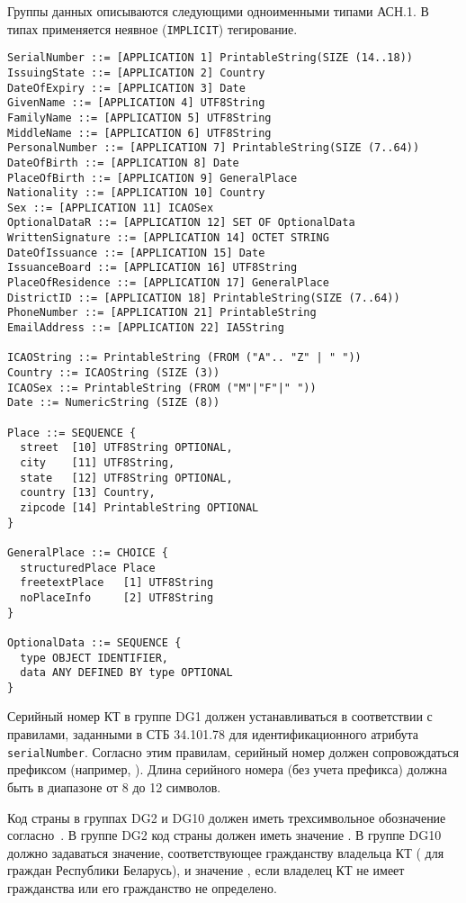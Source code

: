 Группы данных описываются следующими одноименными типами АСН.1.
В типах применяется неявное (\texttt{IMPLICIT}) тегирование.
\begin{verbatim}
SerialNumber ::= [APPLICATION 1] PrintableString(SIZE (14..18))
IssuingState ::= [APPLICATION 2] Country
DateOfExpiry ::= [APPLICATION 3] Date
GivenName ::= [APPLICATION 4] UTF8String
FamilyName ::= [APPLICATION 5] UTF8String
MiddleName ::= [APPLICATION 6] UTF8String
PersonalNumber ::= [APPLICATION 7] PrintableString(SIZE (7..64))
DateOfBirth ::= [APPLICATION 8] Date
PlaceOfBirth ::= [APPLICATION 9] GeneralPlace
Nationality ::= [APPLICATION 10] Country
Sex ::= [APPLICATION 11] ICAOSex
OptionalDataR ::= [APPLICATION 12] SET OF OptionalData
WrittenSignature ::= [APPLICATION 14] OCTET STRING
DateOfIssuance ::= [APPLICATION 15] Date
IssuanceBoard ::= [APPLICATION 16] UTF8String
PlaceOfResidence ::= [APPLICATION 17] GeneralPlace
DistrictID ::= [APPLICATION 18] PrintableString(SIZE (7..64))
PhoneNumber ::= [APPLICATION 21] PrintableString
EmailAddress ::= [APPLICATION 22] IA5String

ICAOString ::= PrintableString (FROM ("A".. "Z" | " "))
Country ::= ICAOString (SIZE (3))
ICAOSex ::= PrintableString (FROM ("M"|"F"|" "))
Date ::= NumericString (SIZE (8))

Place ::= SEQUENCE {
  street  [10] UTF8String OPTIONAL,
  city    [11] UTF8String,
  state   [12] UTF8String OPTIONAL,
  country [13] Country,
  zipcode [14] PrintableString OPTIONAL
}

GeneralPlace ::= CHOICE {
  structuredPlace Place
  freetextPlace   [1] UTF8String
  noPlaceInfo     [2] UTF8String
}

OptionalData ::= SEQUENCE {
  type OBJECT IDENTIFIER,
  data ANY DEFINED BY type OPTIONAL
}
\end{verbatim}

Серийный номер КТ в группе DG1 должен устанавливаться в соответствии с правилами,
заданными в СТБ 34.101.78 для идентификационного атрибута \verb|serialNumber|. 
Согласно этим правилам, серийный номер должен сопровождаться префиксом 
 (например, ).
%
Длина серийного номера (без учета префикса) должна быть в 
диапазоне от 8 до 12 символов. 

Код страны в группах DG2 и DG10 должен иметь трехсимвольное обозначение 
согласно~\cite{CountryCodes}. 
%
В группе DG2 код страны должен иметь значение .
%
В группе DG10 должно задаваться значение, соответствующее
гражданству владельца КТ ( для граждан Республики Беларусь), 
и значение , если владелец КТ не имеет гражданства 
или его гражданство не определено.

